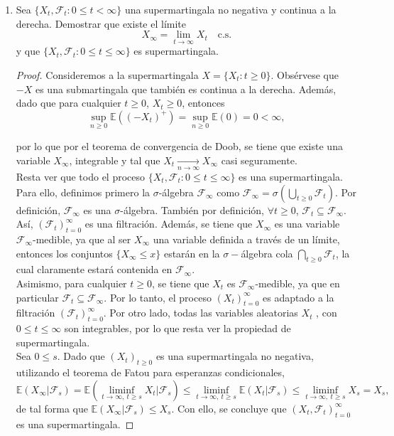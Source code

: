\documentclass[letterpaper]{article}
\newcommand{\F}{\mathcal{F}}
\renewcommand{\to}{\rightarrow}
\newcommand{\E}{\mathbb{E}}
\newcommand{\1}{\mathds{1}}
\theoremstyle{definition}
\theoremstyle{definition}
\theoremstyle{definition}
\theoremstyle{definition}
\theoremstyle{definition}
\begin{document}
\begin{enumerate}
    \item Sea $\{X_t,\F_t : 0\leq t <\infty\}$ una supermartingala no negativa
    y continua a la derecha. Demostrar que existe el límite
     \[
     X_\infty=\lim_{t\to\infty}X_t \quad \text{c.s.} 
     \]
    y que $\{X_t,\F_t:0\leq t \leq \infty\}$ es supermartingala.
    \begin{proof}
        Consideremos a la supermartingala $X=\{X_t:t\geq0\}$. Obsérvese que $-X$ es una submartingala
        que también es continua a la derecha. Además, dado que para cualquier $t\geq0$, $X_t\geq0$, entonces
        \[
        \sup_{n\geq0} \E \left(\left(-X_t\right)^+\right)=\sup_{n\geq0}\E \left(0\right)=0<\infty,    
        \]
        
        por lo que por el teorema de convergencia de Doob, se tiene que existe una variable $X_\infty$,
        integrable y tal que $X_t \xrightarrow[n\to \infty]{} X_\infty$ casi seguramente.\\

        Resta ver que todo el proceso $\{X_t,\F_t:0\leq t \leq \infty\}$ es una supermartingala. Para ello,
        definimos primero la $\sigma$-álgebra $\F_\infty$ como $\F_\infty=\sigma \left(\bigcup_{t\geq0}\F_t\right)$.
        Por definición, $\F_\infty$ es una $\sigma$-álgebra. También por definición, $\forall t\geq0$, $\F_t\subseteq\F_\infty$.
        Así, $(\F_t)_{t=0}^\infty$ es una filtración. Además, se tiene que $X_\infty$ es una variable
        $\F_\infty$-medible, ya que al ser $X_\infty$ una variable definida a través de un límite, entonces
        los conjuntos $\{X_\infty\leq x\}$ estarán en la $\sigma-$álgebra cola $\bigcap_{t\geq0}\F_t$, la cual claramente estará
        contenida en $\F_\infty$.\\

        Asimismo, para cualquier $t\geq0$, se tiene que $X_t$ es $\F_\infty$-medible, ya que en particular
        $\F_t\subseteq\F_\infty$. Por lo tanto, el proceso $(X_t)_{t=0}^{\infty}$ es adaptado a la filtración
        $(\F_t)_{t=0}^{\infty}$. Por otro lado, todas las variables aleatorias $X_t$ , con $0\leq t\leq\infty$
        son integrables, por lo que resta ver la propiedad de supermartingala.\\

        Sea $0\leq s$. Dado que $(X_t)_{t\geq0}$ es una supermartingala no negativa, utilizando el teorema de Fatou
        para esperanzas condicionales, 
        \[
        \E(X_\infty|\F_s)=\E \left(\liminf_{t\to \infty, \ t\geq s}X_t|\F_s\right)\leq \liminf_{t\to \infty, \ t\geq s}\E(X_t|\F_s)
        \leq \liminf_{t\to \infty, \ t\geq s}X_s=X_s,
        \]
        de tal forma que $\E(X_\infty|\F_s)\leq X_s$. Con ello, se concluye que $(X_t,\F_t)_{t=0}^{\infty}$
        es una supermartingala.
    \end{proof}


\end{enumerate}
\end{document}
